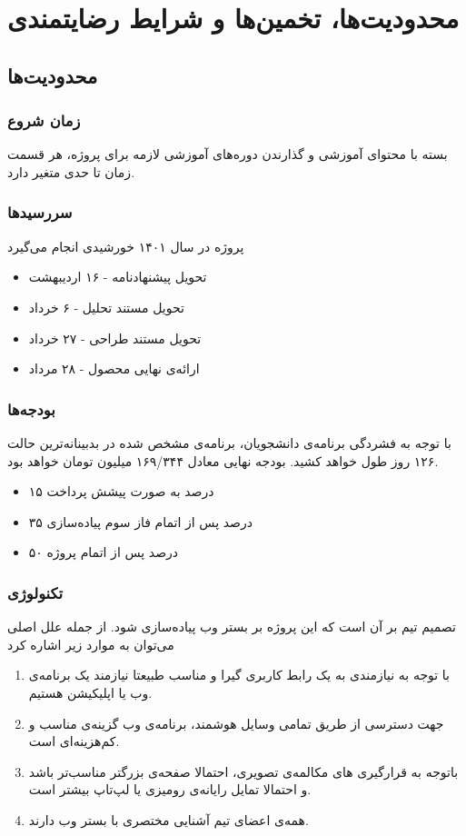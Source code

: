 \section{محدودیت‌ها، تخمین‌ها و شرایط رضایتمندی}

\subsection{محدودیت‌ها}
\subsubsection{زمان شروع}
بسته با محتوای آموزشی و گذارندن دوره‌های آموزشی لازمه برای پروژه، هر قسمت زمان تا حدی متغیر دارد.
\subsubsection{سررسید‌ها}
پروژه در سال ۱۴۰۱ خورشیدی انجام می‌گیرد
\begin{itemize}
    \item تحویل پیشنهادنامه - ۱۶ اردیبهشت
    \item تحویل مستند تحلیل - ۶ خرداد
    \item تحویل مستند طراحی - ۲۷ خرداد
    \item ارائه‌ی نهایی محصول - ۲۸ مرداد
\end{itemize}
\subsubsection{بودجه‌ها}
با توجه به فشردگی برنامه‌ی دانشجویان، برنامه‌ی مشخص شده در بدبینانه‌ترین حالت ۱۲۶ روز طول خواهد کشید. بودجه نهایی معادل ۱۶۹/۳۴۴ میلیون تومان خواهد بود.
\begin{itemize}
    \item ۱۵ درصد به صورت پیشش پرداخت
    \item ۳۵ درصد پس از اتمام فاز سوم پیاده‌سازی
    \item ۵۰ درصد پس از اتمام پروژه
\end{itemize}
\subsubsection{تکنولوژی}
تصمیم تیم بر آن است که این پروژه بر بستر وب پیاده‌سازی شود. از جمله علل اصلی می‌توان به موارد زیر اشاره کرد
\begin{enumerate}
    \item با توجه به نیازمندی به یک رابط کاربری گیرا و مناسب طبیعتا نیازمند یک برنامه‌ی وب یا اپلیکیشن هستیم.
    \item جهت دسترسی از طریق تمامی وسایل هوشمند، برنامه‌ی وب گزینه‌ی مناسب و کم‌هزینه‌ای است.
    \item باتوجه به قرارگیری های مکالمه‌ی تصویری، احتمالا صفحه‌ی بزرگتر مناسب‌تر باشد و احتمالا تمایل رایانه‌ی رومیزی یا لپ‌تاپ بیشتر است.
    \item همه‌ی اعضای تیم آشنایی مختصری با بستر وب دارند.
\end{enumerate}

